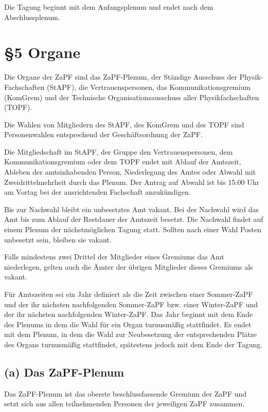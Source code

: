 \documentclass[12pt,oneside]{scrartcl}
\begin{document}
Die Tagung beginnt mit dem Anfangsplenum und endet nach dem Abschlussplenum.


\section{§5 Organe%
  \label{organe}%
}

Die Organe der ZaPF sind das ZaPF-Plenum, der Ständige Ausschuss der
Physik-Fachschaften (StAPF), die Vertrauenspersonen, das Kommunikationsgremium
(KomGrem) und der Technische Organisationsausschuss aller Physikfachschaften
(TOPF).

Die Wahlen von Mitgliedern des StAPF, des KomGrem und des TOPF sind
Personenwahlen entsprechend der Geschäftsordnung der ZaPF.

Die Mitgliedschaft im StAPF, der Gruppe den Vertrauenspersonen, dem Kommunikationsgremium
oder dem TOPF endet mit Ablauf der Amtszeit, Ableben der amtsinhabenden Person,
Niederlegung des Amtes oder Abwahl mit Zweidrittelmehrheit durch das Plenum.
Der Antrag auf Abwahl ist bis 15:00 Uhr am Vortag bei der ausrichtenden
Fachschaft anzukündigen.

Bis zur Nachwahl bleibt ein unbesetztes Amt vakant. Bei der Nachwahl wird das
Amt bis zum Ablauf der Restdauer der Amtszeit besetzt.
Die Nachwahl findet auf einem Plenum der nächstmöglichen Tagung statt.
Sollten nach einer Wahl Posten unbesetzt sein, bleiben sie vakant.

Falls mindestens zwei Drittel der Mitglieder eines Gremiums das Amt niederlegen,
gelten auch die Ämter der übrigen Mitglieder dieses Gremiums als vakant.

Für Amtszeiten sei ein Jahr definiert als die Zeit zwischen einer Sommer-ZaPF
und der ihr nächsten nachfolgenden Sommer-ZaPF bzw. einer Winter-ZaPF und der
ihr nächsten nachfolgenden Winter-ZaPF.
Das Jahr beginnt mit dem Ende des Plenums in dem die Wahl für ein Organ
turnusmäßig stattfindet.
Es endet mit dem Plenum, in dem die Wahl zur Neubesetzung der entsprechenden
Plätze des Organs turnusmäßig stattfindet, spätestens jedoch mit dem Ende der
Tagung.


\subsection{(a) Das ZaPF-Plenum%
  \label{a-das-zapf-plenum}%
}

Das ZaPF-Plenum ist das oberste beschlussfassende Gremium der ZaPF und setzt
sich aus allen teilnehmenden Personen der jeweiligen ZaPF zusammen.
\end{document}
